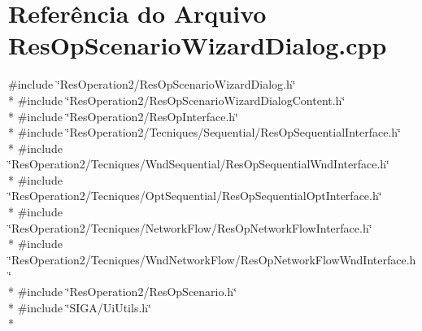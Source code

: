 \section{Referência do Arquivo Res\+Op\+Scenario\+Wizard\+Dialog.\+cpp}
\label{_res_op_scenario_wizard_dialog_8cpp}
{\ttfamily \#include \char`\"{}Res\+Operation2/\+Res\+Op\+Scenario\+Wizard\+Dialog.\+h\char`\"{}}\\*
{\ttfamily \#include \char`\"{}Res\+Operation2/\+Res\+Op\+Scenario\+Wizard\+Dialog\+Content.\+h\char`\"{}}\\*
{\ttfamily \#include \char`\"{}Res\+Operation2/\+Res\+Op\+Interface.\+h\char`\"{}}\\*
{\ttfamily \#include \char`\"{}Res\+Operation2/\+Tecniques/\+Sequential/\+Res\+Op\+Sequential\+Interface.\+h\char`\"{}}\\*
{\ttfamily \#include \char`\"{}Res\+Operation2/\+Tecniques/\+Wnd\+Sequential/\+Res\+Op\+Sequential\+Wnd\+Interface.\+h\char`\"{}}\\*
{\ttfamily \#include \char`\"{}Res\+Operation2/\+Tecniques/\+Opt\+Sequential/\+Res\+Op\+Sequential\+Opt\+Interface.\+h\char`\"{}}\\*
{\ttfamily \#include \char`\"{}Res\+Operation2/\+Tecniques/\+Network\+Flow/\+Res\+Op\+Network\+Flow\+Interface.\+h\char`\"{}}\\*
{\ttfamily \#include \char`\"{}Res\+Operation2/\+Tecniques/\+Wnd\+Network\+Flow/\+Res\+Op\+Network\+Flow\+Wnd\+Interface.\+h\char`\"{}}\\*
{\ttfamily \#include \char`\"{}Res\+Operation2/\+Res\+Op\+Scenario.\+h\char`\"{}}\\*
{\ttfamily \#include \char`\"{}S\+I\+G\+A/\+Ui\+Utils.\+h\char`\"{}}\\*

